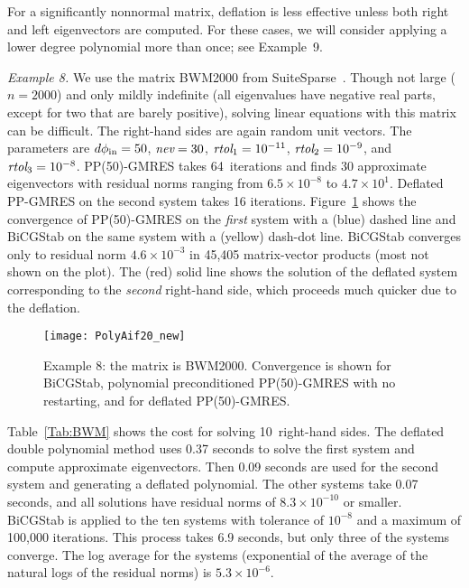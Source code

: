 \documentclass{siamart}
\def\nev{\mbox{{\it nev}}}
\def\rtol{\mbox{{\it rtol}}}
\begin{document}
For a significantly nonnormal matrix, deflation is less effective unless both right and left eigenvectors are computed.  
For these cases, we will consider applying a lower degree polynomial more than once; see Example~9. 

{\it Example 8.}  We use the matrix BWM2000 from SuiteSparse~\cite{SuiteSparse}.  
Though not large ($n=2000$) and only mildly indefinite (all eigenvalues have negative real parts, except for two that are barely positive), solving linear equations with this matrix can be difficult.  The right-hand sides are again random unit vectors.  The parameters are $d\phi_{\rm in}=50$, $\nev=30$, $\rtol_1 = 10^{-11}$, $\rtol_2 = 10^{-9}$, and $\rtol_3 = 10^{-8}$.  PP(50)-GMRES takes 64~iterations and finds 30 approximate eigenvectors with residual norms ranging from $6.5\times 10^{-8}$ to $4.7\times 10^1$.  Deflated PP-GMRES on the second system takes 16 iterations.  Figure~\ref{Fig:pAif20} shows the convergence of PP(50)-GMRES on the \emph{first} system with a (blue) dashed line and BiCGStab on the same system with a (yellow) dash-dot line.  
BiCGStab converges only to residual norm $4.6\times10^{-3}$ in 45{,}405 matrix-vector products (most not shown on the plot).  
The (red) solid line shows the solution of the deflated system corresponding to the \emph{second} right-hand side, which proceeds much quicker due to the deflation.  


\begin{figure}[t!]
\begin{center}
\texttt{[image: PolyAif20\_new]}
\end{center}
\vspace{-7pt}
\caption{Example 8: the matrix is BWM2000.  Convergence is shown for BiCGStab, polynomial preconditioned PP(50)-GMRES with no restarting, and for deflated PP(50)-GMRES.}
\label{Fig:pAif20}
\end{figure}


Table~\ref{Tab:BWM} shows the cost for solving 10~right-hand sides.  The deflated double polynomial method uses 0.37 seconds to solve the first system and compute approximate eigenvectors.  Then 0.09 seconds are used for the second system and generating a deflated polynomial.  The other systems take 0.07 seconds, and all solutions have residual norms of $8.3\times10^{-10}$ or smaller.  BiCGStab is applied to the ten systems with tolerance of $10^{-8}$ and a maximum of 100,000 iterations.  This process takes 6.9 seconds, but only three of the systems converge.  The log average for the systems (exponential of the average of the natural logs of the residual norms) is $5.3\times 10^{-6}$.
\end{document}
